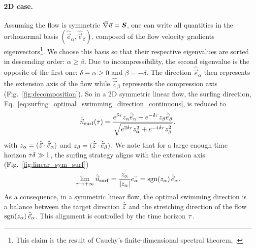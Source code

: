 \paragraph{2D case.}
Assuming the flow is symmetric $\vec{\nabla} \vec{u} = \boldsymbol{S}$, one can write all quantities in the orthonormal basis $(\hat{\vec{e}}_{\alpha}, \hat{\vec{e}}_{\beta})$, composed of the flow velocity gradients eigenvectors\footnote{This claim is the result of Cauchy's finite-dimensional spectral theorem, \citep{hawkins1975cauchy}.}.
We choose this basis so that their respective eigenvalues are sorted in descending order: $\alpha \ge \beta$. 
Due to incompressibility, the second eigenvalue is the opposite of the first one: $\delta \equiv \alpha \ge 0$ and $\beta = -\delta$.
The direction $\hat{\vec{e}}_{\alpha}$ then represents the extension axis of the flow while $\hat{\vec{e}}_{\beta}$ represents the compression axis (Fig.~\ref{fig:decomposition}).
So in a 2D symmetric linear flow, the surfing direction, Eq.~\eqref{eq:surfing_optimal_swimming_direction_continuous}, is reduced to
\begin{equation}
	\label{eq:optimal_swimming_direction_sym}
	\hat{\vec{n}}_{\mathrm{surf}}(\tau) = \frac{e^{\delta \tau} z_\alpha \hat{\vec{e}}_{\alpha} + e^{-\delta \tau} z_\beta \hat{\vec{e}}_{\beta}}{\sqrt{e^{2 \delta \tau} z_\alpha^2 + e^{-4 \delta \tau} z_\beta^2}}.
\end{equation}
with $z_\alpha = ( \hat{\vec{z}} \cdot \hat{\vec{e}}_{\alpha} )$ and $z_\beta = ( \hat{\vec{z}} \cdot \hat{\vec{e}}_{\beta} )$.
We note that for a large enough time horizon $\tau \delta \gg 1$, the surfing strategy aligns with the extension axis (Fig.~\ref{fig:linear_sym_surf})
\begin{equation}
	\label{eq:optimal_swimming_direction_sym_lim}
	\lim_{\tau \to +\infty} \hat{\vec{n}}_{\mathrm{surf}} = \frac{z_{\alpha}}{\lvert z_{\alpha}\rvert} \vec{e_{\alpha}} = \operatorname{sgn}(z_{\alpha}) \, \hat{\vec{e}}_{\alpha}.
\end{equation}
As a consequence, in a symmetric linear flow, the optimal swimming direction is a balance between the target direction $\hat{\vec{z}}$ and the stretching direction of the flow $\operatorname{sgn}(z_{\alpha}) \, \hat{\vec{e}}_{\alpha}$. 
This alignment is controlled by the time horizon $\tau$.
